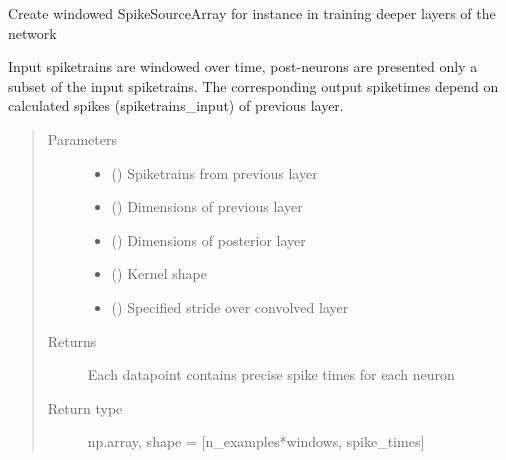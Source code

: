 \documentclass[letterpaper,10pt,english]{sphinxmanual}
\begin{document}
\begin{fulllineitems}
\label{\detokenize{SpikingConvNet:SpikingConvNet.algorithms.windowed_spikes}}
Create windowed SpikeSourceArray
for instance in training deeper layers of the network

Input spiketrains are windowed over time, post-neurons are presented only
a subset of the input spiketrains. The corresponding output spiketimes
depend on calculated spikes (spiketrains\_input) of previous layer.
\begin{quote}\begin{description}
\item[{Parameters}] \leavevmode\begin{itemize}
\item {} 
 () \textendash{} Spiketrains from previous layer

\item {} 
 () \textendash{} Dimensions of previous layer

\item {} 
 () \textendash{} Dimensions of posterior layer

\item {} 
 () \textendash{} Kernel shape

\item {} 
 () \textendash{} Specified stride over convolved layer

\end{itemize}

\item[{Returns}] \leavevmode
{} \textendash{} Each datapoint contains precise spike times for each neuron

\item[{Return type}] \leavevmode
np.array, shape = {[}n\_examples*windows, spike\_times{]}

\end{description}\end{quote}

\end{fulllineitems}
\end{document}
